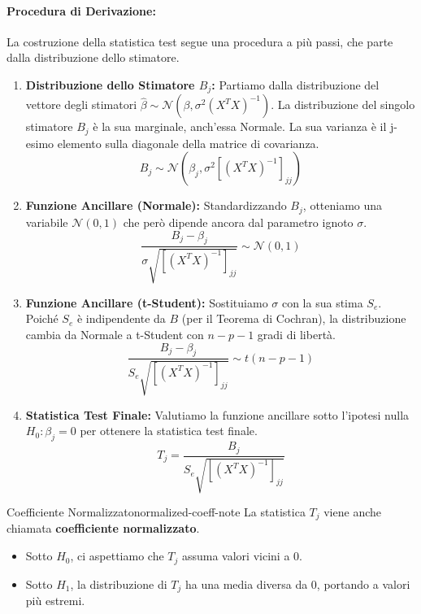 \paragraph{Procedura di Derivazione:} La costruzione della statistica test segue
una procedura a più passi, che parte dalla distribuzione dello stimatore.
\begin{enumerate}
	\item \textbf{Distribuzione dello Stimatore \(B_j\):} Partiamo dalla
	      distribuzione del vettore degli stimatori \(\hat{\beta} \sim
	      \mathcal{N}(\beta, \sigma^2(X^T X)^{-1})\). La distribuzione del singolo
	      stimatore \(B_j\) è la sua marginale, anch'essa Normale. La sua varianza è
	      il j-esimo elemento sulla diagonale della matrice di covarianza.
	      \[
		      B_j \sim \mathcal{N}\left(\beta_j, \sigma^2[(X^T
		      X)^{-1}]_{jj}\right)
	      \]

	\item \textbf{Funzione Ancillare (Normale):} Standardizzando \(B_j\),
	      otteniamo una variabile \(\mathcal{N}(0,1)\) che però dipende ancora dal
	      parametro ignoto \(\sigma\).
	      \[
		      \frac{B_j - \beta_j}{\sigma\sqrt{[(X^T X)^{-1}]_{jj}}} \sim
		      \mathcal{N}(0,1)
	      \]

	\item \textbf{Funzione Ancillare (t-Student):} Sostituiamo \(\sigma\) con la
	      sua stima \(S_e\). Poiché \(S_e\) è indipendente da \(B\) (per il Teorema
	      di Cochran), la distribuzione cambia da Normale a t-Student con \(n-p-1\)
	      gradi di libertà.
	      \[
		      \frac{B_j - \beta_j}{S_e\sqrt{[(X^T X)^{-1}]_{jj}}} \sim t(n-p-1)
	      \]

	\item \textbf{Statistica Test Finale:} Valutiamo la funzione ancillare sotto
	      l'ipotesi nulla \(H_0: \beta_j = 0\) per ottenere la statistica test finale.
	      \[
		      T_j = \frac{B_j}{S_e\sqrt{[(X^T X)^{-1}]_{jj}}}
	      \]
\end{enumerate}

\begin{nota}{Coefficiente Normalizzato}{normalized-coeff-note}
	La statistica \(T_j\) viene anche chiamata \textbf{coefficiente
		normalizzato}.
	\begin{itemize}
		\item Sotto \(H_0\), ci aspettiamo che \(T_j\) assuma valori vicini a 0.
		\item Sotto \(H_1\), la distribuzione di \(T_j\) ha una media diversa da
		      0, portando a valori più estremi.
	\end{itemize}
\end{nota}

